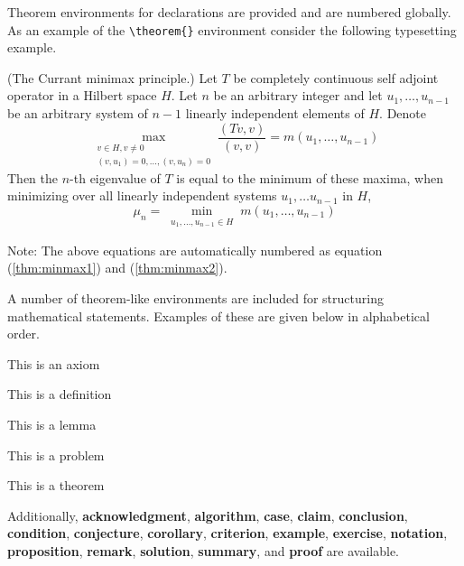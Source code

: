  Theorem environments for declarations are provided and are numbered globally.
As an example of the \verb|\theorem{}| environment consider the following typesetting example.
\begin{theorem}
(The Currant minimax principle.) Let $T$ be completely continuous self adjoint operator
in a Hilbert space $H$. Let $n$ be an arbitrary integer and let $u_1,\ldots,u_{n-1}$ be
an arbitrary system of $n-1$ linearly independent elements of $H$. Denote
\begin{equation}
\max_{\substack{v\in H, v\neq
0\\(v,u_1)=0,\ldots,(v,u_n)=0}}\frac{(Tv,v)}{(v,v)}=m(u_1,\ldots, u_{n-1})
\label{thm:minmax1}
\end{equation}
Then the $n$-th eigenvalue of $T$ is equal to the minimum of these maxima, when
minimizing over all linearly independent systems $u_1,\ldots u_{n-1}$ in $H$,
\begin{equation}
\mu_n = \min_{\substack{u_1,\ldots, u_{n-1}\in H}} m(u_1,\ldots, u_{n-1}) \label{thm:minmax2}
\end{equation}
\end{theorem}
Note: The above equations are automatically numbered as equation (\ref{thm:minmax1}) and
(\ref{thm:minmax2}).



A number of theorem-like environments are included for structuring mathematical statements.  Examples of these are given below in alphabetical order.

\begin{axiom}
This is an axiom
\end{axiom}


\begin{definition}
This is a definition
\end{definition}


\begin{lemma}
This is a lemma
\end{lemma}

\begin{problem}
This is a problem
\end{problem}



\begin{theorem}
This is a theorem
\end{theorem}

Additionally, {\bf acknowledgment}, {\bf algorithm}, {\bf case}, {\bf claim}, {\bf conclusion}, {\bf condition},
{\bf conjecture}, {\bf corollary}, {\bf criterion}, {\bf example}, {\bf exercise}, {\bf notation},
{\bf proposition}, {\bf remark}, {\bf solution}, {\bf summary}, and {\bf proof} are available.

